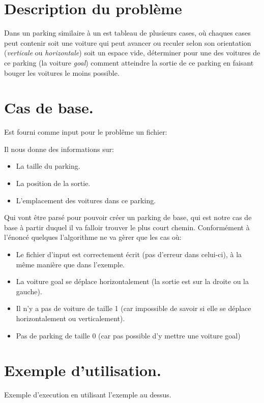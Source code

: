 \documentclass[10pt, a4paper]{article}
\begin{document}
\section{Description du problème}
    Dans un parking similaire à un est tableau de plusieurs cases,
    où chaques cases peut contenir soit une voiture qui peut avancer
    ou reculer selon son orientation (\emph{verticale} ou \emph{horizontale})
    soit un espace vide, déterminer pour une des voitures de ce parking
    (la voiture \emph{goal}) comment atteindre la sortie de ce parking en
    faisant bouger les voitures le moins possible.

\section{Cas de base.}
    Est fourni comme input pour le problême un fichier: \newline
    
    Il nous donne des informations sur:
    \begin{itemize}
        \item La taille du parking.
        \item La position de la sortie.
        \item L'emplacement des voitures dans ce parking.
    \end{itemize}
    Qui vont être parsé pour pouvoir créer un parking de base, qui est notre
    cas de base à partir duquel il va falloir trouver le plus court
    chemin.\newline
    Conformément à l'énoncé quelques l'algorithme ne va gèrer que les cas où:
    \begin{itemize}
        \item Le fichier d'input est correctement écrit (pas d'erreur dans
            celui-ci), à la même manière que dans l'exemple.
        \item La voiture goal se déplace horizontalement (la sortie est sur la
            droite ou la gauche).
        \item Il n'y a pas de voiture de taille 1 (car impossible de savoir si
            elle se déplace horizontalement ou verticalement).
        \item Pas de parking de taille 0 (car pas possible d'y mettre une
            voiture goal)
    \end{itemize}

\section{Exemple d'utilisation.}
Exemple d'execution en utilisant l'exemple au dessus.
\end{document}
